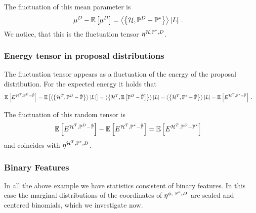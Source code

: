 The fluctuation of this mean parameter is
\begin{align*}
	\mu^D - \mathbb{E}\left[\mu^D\right] =  \left\langle \left\{\mathcal{H},\mathbb{P}^{D}-\mathbb{P}^*\right\}\right\rangle \left[ L \right] \, . 
\end{align*}
We notice, that this is the fluctuation tensor $\eta^{\mathcal{H}, \mathbb{P}^*, D}$.


\subsubsection{Energy tensor in proposal distributions}

The fluctuation tensor appears as a fluctuation of the energy of the proposal distribution.
For the expected energy it holds that
\begin{align*}
	\mathbb{E}\left[E^{\mathcal{H}^T,\mathbb{P}^{D}-\tilde{\mathbb{P}}}\right] 
	= \mathbb{E}\left[\left\langle \left\{\mathcal{H}^T,\mathbb{P}^{D}-\tilde{\mathbb{P}}\right\}\right\rangle \left[ L \right]\right] 
	= \left\langle \left\{\mathcal{H}^T,\mathbb{E}\left[\mathbb{P}^{D}-\tilde{\mathbb{P}}\right]\right\}\right\rangle \left[ L \right]
	= \left\langle \left\{\mathcal{H}^T,\mathbb{P}^*-\tilde{\mathbb{P}}\right\}\right\rangle \left[ L \right] 
	= \mathbb{E}\left[E^{\mathcal{H}^T,\mathbb{P}^*-\tilde{\mathbb{P}}}\right] \, . 
\end{align*}

The fluctuation of this random tensor is
\begin{align*}
	\mathbb{E}\left[E^{\mathcal{H}^T,\mathbb{P}^{D}-\tilde{\mathbb{P}}}\right]  - \mathbb{E}\left[E^{\mathcal{H}^T,\mathbb{P}^*-\tilde{\mathbb{P}}}\right] 
	= \mathbb{E}\left[E^{\mathcal{H}^T,\mathbb{P}^{D}-\mathbb{P}^*}\right]
\end{align*}
and coincides with $\eta^{\mathcal{H}^T, \mathbb{P}^*, D}$.
	




\subsubsection{Binary Features}

In all the above example we have statistics consistent of binary features.
In this case the marginal distributions of the coordinates of $\expfamfluctuation$ are scaled and centered binomials, which we investigate now.

